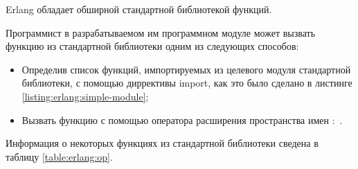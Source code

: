 
Erlang обладает обширной стандартной библиотекой функций.

Программист в разрабатываемом им программном модуле может вызвать функцию из стандартной библиотеки одним из следующих способов:

\begin{itemize}

	\item Определив список функций, импортируемых из целевого модуля стандартной библиотеки, с помощью диррективы import, как это было сделано в листинге \ref{listing:erlang:simple-module};
	\item Вызвать функцию с помощью оператора расширения пространства имен :~.

\end{itemize}

Информация о некоторых функциях из стандартной библиотеки сведена в таблицу \ref{table:erlang:op}.

\newcommand{\elhead}[1]
{
	\multicolumn{6}{r}{Таблица~\thetable~---~Некоторые функции стандартной библиотеки~(#1)} \\
	\hline
	\multirow{2}{*}{\bf Функция} & \multicolumn{3}{c|}{\bf Параметры} & \multirow{2}{*}{\vbox{\centering \bf Возвращаемое \\ значение}} & \multirow{2}{*}{\bf Примечание} \\
	\cline{2-4}
	& \bf 1 & \bf 2 & \bf 3 && \\
	\hline
}

\newcommand{\elf}[6]{#1 & #2 & #3 & #4 & #5 & #6 \\}

